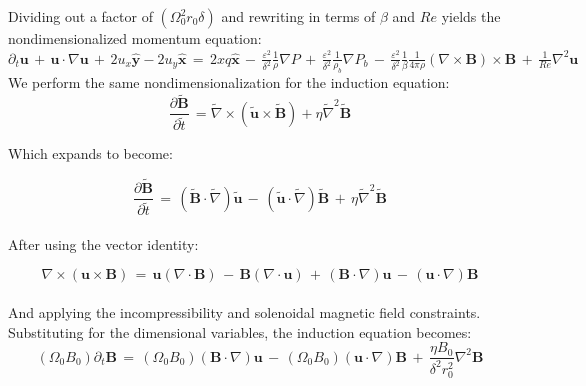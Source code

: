 \documentclass[letterpaper,12pt]{article}
\newcommand\reye{\mathrel{Re}}
\begin{document}
Dividing out a factor of $\left(\Omega_0^2 r_0 \delta\right)$ and rewriting in terms of $\beta$ and $\reye$ yields the nondimensionalized momentum equation: \\

$\partial_t \mathbf{u} \, + \, \mathbf{u} \cdot \nabla \mathbf{u} \, + \, 2 u_x \mathbf{\hat{y}} - 2 u_y \mathbf{\hat{x}} \, = \, 2 x q \mathbf{\hat{x}} \, - \, \frac{\varepsilon^2}{\delta^2} \frac{1}{\rho} \nabla P \, + \,  \frac{\varepsilon^2}{\delta^2} \frac{1}{\rho_b} \nabla P_b \, - \, \frac{\varepsilon^2}{\delta^2} \frac{1}{\beta} \frac{1}{4 \pi \rho} \left( \nabla \times \mathbf{B} \right) \times \mathbf{B} \, + \, \frac{1}{\reye} \nabla^2 \mathbf{u}$ \\

We perform the same nondimensionalization for the induction equation: \\

\[\frac{\partial \widetilde{\mathbf{B}}}{\partial \widetilde{t}} \,  = \widetilde{\nabla} \times \left(\widetilde{\mathbf{u}} \times \widetilde{\mathbf{B}}\right) + \eta\widetilde{\nabla}^2 \widetilde{\mathbf{B}} \] 

Which expands to become:

\[\frac{\partial \widetilde{\mathbf{B}}}{\partial \widetilde{t}} \, = \, \left(\widetilde{\mathbf{B}} \cdot \widetilde{\nabla} \right) \widetilde{\mathbf{u}} \, - \, \left(\widetilde{\mathbf{u}} \cdot \widetilde{\nabla} \right) \widetilde{\mathbf{B}} \, + \, \eta \widetilde{\nabla}^2\widetilde{\mathbf{B}} \] \\

After using the vector identity:

\[\nabla \times \left(\mathbf{u} \times \mathbf{B}\right) \, = \, \mathbf{u}\left(\nabla \cdot \mathbf{B}\right) \, - \, \mathbf{B}\left(\nabla \cdot \mathbf{u}\right) \, + \, \left(\mathbf{B} \cdot \nabla\right)\mathbf{u} \, - \, \left(\mathbf{u} \cdot \nabla\right)\mathbf{B} \] \\

And applying the incompressibility and solenoidal magnetic field constraints. \\

Substituting for the dimensional variables, the induction equation becomes: \\

\[\left(\Omega_0 B_0\right) \partial_t\mathbf{B} \, = \, \left(\Omega_0 B_0\right)\left(\mathbf{B} \cdot \nabla\right)\mathbf{u} \, - \, \left(\Omega_0 B_0\right)\left(\mathbf{u} \cdot \nabla \right)\mathbf{B} \, + \, \frac{\eta B_0}{\delta^2 r_0^2}\nabla^2\mathbf{B} \]
\end{document}
